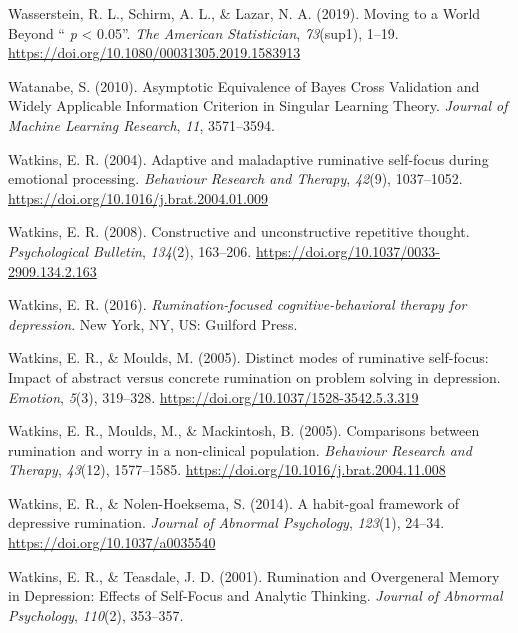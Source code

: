 \documentclass[a4paper,12pt,twoside,openright,oldfontcommands]{memoir}
\begin{document}
\leavevmode\hypertarget{ref-wasserstein_moving_2019}{}%
Wasserstein, R. L., Schirm, A. L., \& Lazar, N. A. (2019). Moving to a World Beyond `` \emph{p} \textless{} 0.05''. \emph{The American Statistician}, \emph{73}(sup1), 1--19. \url{https://doi.org/10.1080/00031305.2019.1583913}

\leavevmode\hypertarget{ref-watanabe_asymptotic_2010}{}%
Watanabe, S. (2010). Asymptotic Equivalence of Bayes Cross Validation and Widely Applicable Information Criterion in Singular Learning Theory. \emph{Journal of Machine Learning Research}, \emph{11}, 3571--3594.

\leavevmode\hypertarget{ref-watkins_adaptive_2004}{}%
Watkins, E. R. (2004). Adaptive and maladaptive ruminative self-focus during emotional processing. \emph{Behaviour Research and Therapy}, \emph{42}(9), 1037--1052. \url{https://doi.org/10.1016/j.brat.2004.01.009}

\leavevmode\hypertarget{ref-Watkins2008}{}%
Watkins, E. R. (2008). Constructive and unconstructive repetitive thought. \emph{Psychological Bulletin}, \emph{134}(2), 163--206. \url{https://doi.org/10.1037/0033-2909.134.2.163}

\leavevmode\hypertarget{ref-watkins_rumination-focused_2016}{}%
Watkins, E. R. (2016). \emph{Rumination-focused cognitive-behavioral therapy for depression}. New York, NY, US: Guilford Press.

\leavevmode\hypertarget{ref-watkins_distinct_2005}{}%
Watkins, E. R., \& Moulds, M. (2005). Distinct modes of ruminative self-focus: Impact of abstract versus concrete rumination on problem solving in depression. \emph{Emotion}, \emph{5}(3), 319--328. \url{https://doi.org/10.1037/1528-3542.5.3.319}

\leavevmode\hypertarget{ref-watkins_comparisons_2005}{}%
Watkins, E. R., Moulds, M., \& Mackintosh, B. (2005). Comparisons between rumination and worry in a non-clinical population. \emph{Behaviour Research and Therapy}, \emph{43}(12), 1577--1585. \url{https://doi.org/10.1016/j.brat.2004.11.008}

\leavevmode\hypertarget{ref-watkins_habit-goal_2014}{}%
Watkins, E. R., \& Nolen-Hoeksema, S. (2014). A habit-goal framework of depressive rumination. \emph{Journal of Abnormal Psychology}, \emph{123}(1), 24--34. \url{https://doi.org/10.1037/a0035540}

\leavevmode\hypertarget{ref-watkins_rumination_2001}{}%
Watkins, E. R., \& Teasdale, J. D. (2001). Rumination and Overgeneral Memory in Depression: Effects of Self-Focus and Analytic Thinking. \emph{Journal of Abnormal Psychology}, \emph{110}(2), 353--357.
\end{document}
